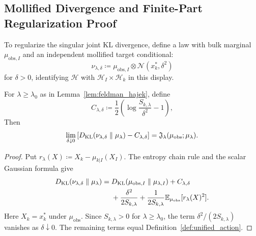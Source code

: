\subsection{Mollified Divergence and Finite-Part Regularization Proof}

To regularize the singular joint KL divergence, define a law with
bulk marginal $\mu_{\mathrm{obs},I}$ and an independent mollified
target conditional:
\begin{equation}
  \nu_{\lambda,\delta} \coloneqq \mu_{\mathrm{obs},I} \otimes \mathcal{N}(x_k^*, \delta^2)
\end{equation}
for $\delta>0$, identifying $\mathcal{H}$ with
$\mathcal{H}_I\times\mathcal{H}_k$ in this display.

\begin{proposition}
\label{prop:mollification_limit}
For $\lambda\ge\lambda_0$ as in Lemma~\ref{lem:feldman_hajek}, define
\begin{equation}
  C_{\lambda,\delta} \coloneqq \frac{1}{2} \left( \log \frac{S_{k,\lambda}}{\delta^2} - 1 \right),
\end{equation}
Then
\begin{equation}
  \lim_{\delta \downarrow 0}
  \left[D_{\operatorname{KL}}(\nu_{\lambda,\delta} \parallel \mu_\lambda)
  - C_{\lambda,\delta}\right]
  = \mathfrak{J}_\lambda(\mu_{\mathrm{obs}}; \mu_\lambda).
\end{equation}
\end{proposition}
\begin{proof}
Put $r_\lambda(X)\coloneqq X_k-\mu_{k|I}(X_I)$. The entropy
chain rule and the scalar Gaussian formula give
\begin{align}
  D_{\operatorname{KL}}(\nu_{\lambda,\delta}\parallel\mu_\lambda)
  ={}&D_{\operatorname{KL}}(\mu_{\mathrm{obs},I}\parallel\mu_{\lambda,I})
      + C_{\lambda,\delta} \nonumber\\
     &+\frac{\delta^2}{2S_{k,\lambda}}
      +\frac{1}{2S_{k,\lambda}}
       \mathbb{E}_{\mu_{\mathrm{obs}}}
       [r_\lambda(X)^2].
\end{align}
Here $X_k=x_k^*$ under $\mu_{\mathrm{obs}}$. Since
$S_{k,\lambda}>0$ for $\lambda\ge\lambda_0$, the term
$\delta^2/(2S_{k,\lambda})$ vanishes as $\delta\downarrow0$.
The remaining terms equal Definition~\ref{def:unified_action}.
\end{proof}

